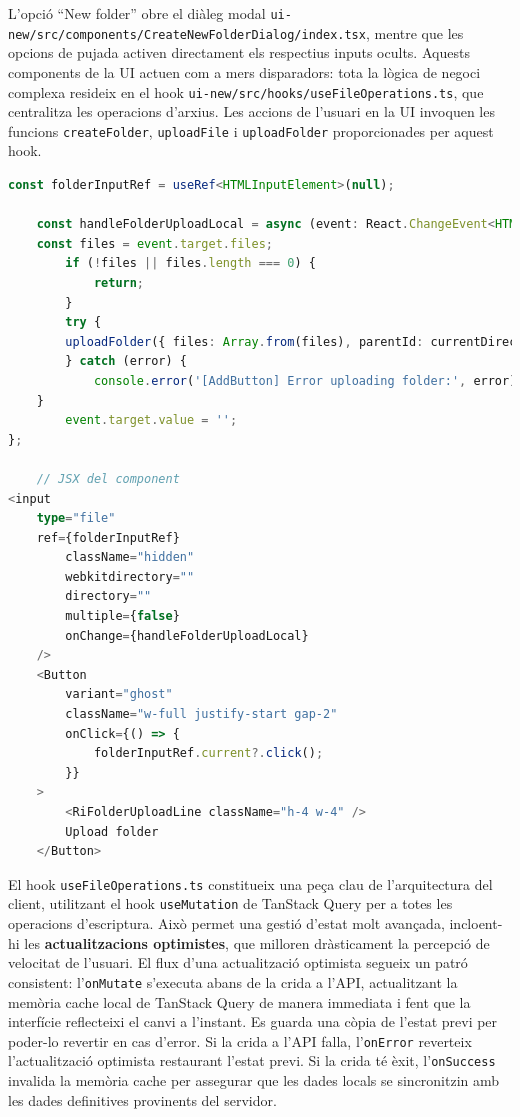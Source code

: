 L'opció ``New folder'' obre el diàleg modal \texttt{ui-new/src/components/CreateNewFolderDialog/index.tsx}, mentre que les opcions de pujada activen directament els respectius inputs ocults. Aquests components de la UI actuen com a mers disparadors: tota la lògica de negoci complexa resideix en el hook \texttt{ui-new/src/hooks/useFileOperations.ts}, que centralitza les operacions d'arxius. Les accions de l'usuari en la UI invoquen les funcions \texttt{createFolder}, \texttt{uploadFile} i \texttt{uploadFolder} proporcionades per aquest hook.

\begin{lstlisting}[language=typescript, caption={Activació de la pujada de carpetes a `AddButton/index.tsx`}]
const folderInputRef = useRef<HTMLInputElement>(null);
    
    const handleFolderUploadLocal = async (event: React.ChangeEvent<HTMLInputElement>) => {
    const files = event.target.files;
        if (!files || files.length === 0) {
            return;
        }
        try {
        uploadFolder({ files: Array.from(files), parentId: currentDirectory.id!.toString() });
        } catch (error) {
            console.error('[AddButton] Error uploading folder:', error);
    }
        event.target.value = '';
};
    
    // JSX del component
<input
    type="file"
    ref={folderInputRef}
        className="hidden"
        webkitdirectory=""
        directory=""
        multiple={false}
        onChange={handleFolderUploadLocal}
    />
    <Button
        variant="ghost"
        className="w-full justify-start gap-2"
        onClick={() => {
            folderInputRef.current?.click();
        }}
    >
        <RiFolderUploadLine className="h-4 w-4" />
        Upload folder
    </Button>
\end{lstlisting}

El hook \texttt{useFileOperations.ts} constitueix una peça clau de l'arquitectura del client, utilitzant el hook \texttt{useMutation} de TanStack Query per a totes les operacions d'escriptura. Això permet una gestió d'estat molt avançada, incloent-hi les \textbf{actualitzacions optimistes}, que milloren dràsticament la percepció de velocitat de l'usuari. El flux d'una actualització optimista segueix un patró consistent: l'\texttt{onMutate} s'executa abans de la crida a l'API, actualitzant la memòria cache local de TanStack Query de manera immediata i fent que la interfície reflecteixi el canvi a l'instant. Es guarda una còpia de l'estat previ per poder-lo revertir en cas d'error. Si la crida a l'API falla, l'\texttt{onError} reverteix l'actualització optimista restaurant l'estat previ. Si la crida té èxit, l'\texttt{onSuccess} invalida la memòria cache per assegurar que les dades locals se sincronitzin amb les dades definitives provinents del servidor.

